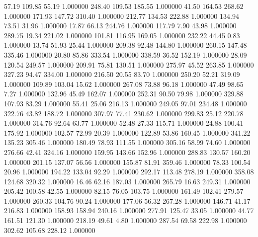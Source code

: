      57.19    109.85     55.19  1.000000
    248.40    109.53    185.55  1.000000
     41.50    164.53    268.62  1.000000
    171.93    147.72    310.40  1.000000
    212.77    134.53    222.88  1.000000
    134.94     73.51     31.96  1.000000
     17.87     66.13    244.76  1.000000
    117.79      7.90     43.98  1.000000
    289.75     19.34    221.02  1.000000
    101.81    116.95    169.05  1.000000
    232.22     44.45      0.83  1.000000
     13.74     51.93     25.44  1.000000
    209.38     92.48    144.80  1.000000
    260.15    147.48    335.46  1.000000
     20.80     85.86    333.54  1.000000
    338.59     36.52    152.19  1.000000
     28.09    120.54    249.57  1.000000
    209.91     75.81    130.51  1.000000
    275.97     45.52    263.85  1.000000
    327.23     94.47    334.00  1.000000
    216.50     20.55     83.70  1.000000
    250.20     52.21    319.09  1.000000
    109.89    103.04     15.62  1.000000
    267.08     73.88     96.18  1.000000
     47.49     98.65      7.27  1.000000
    132.96     45.49    162.07  1.000000
    252.31     90.50     79.98  1.000000
    329.88    107.93     83.29  1.000000
     55.41     25.06    216.13  1.000000
    249.05     97.01    234.48  1.000000
    322.76     43.82    188.72  1.000000
    307.97     77.41    230.62  1.000000
    299.83     25.12    220.78  1.000000
    314.76     92.64     63.77  1.000000
     52.48     27.33    115.71  1.000000
     24.88    100.41    175.92  1.000000
    102.57     72.99     20.39  1.000000
    122.89     53.86    160.45  1.000000
    341.22    135.23    305.46  1.000000
    180.49     78.93    111.55  1.000000
    305.16     58.99     74.60  1.000000
    276.66     42.41    324.16  1.000000
    159.95    143.66    152.96  1.000000
    288.83    130.57    160.20  1.000000
    201.15    137.07     56.56  1.000000
    155.87     81.91    359.46  1.000000
     78.33    100.54     20.96  1.000000
    194.22    133.04     92.29  1.000000
    292.17    113.48    278.19  1.000000
    358.08    124.68    320.32  1.000000
     16.46     62.16    187.03  1.000000
    265.79     16.63    249.31  1.000000
    205.42    100.58     42.55  1.000000
     82.15     76.05    103.75  1.000000
    161.49    102.41    279.57  1.000000
    260.33    104.76     90.24  1.000000
    177.06     56.32    267.28  1.000000
    146.71     41.17    216.83  1.000000
    158.93    158.94    240.16  1.000000
    277.91    125.47     33.05  1.000000
     44.77    161.51    121.30  1.000000
    218.19     49.61      4.80  1.000000
    287.54     69.58    222.98  1.000000
    302.62    105.68    228.12  1.000000
